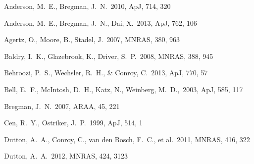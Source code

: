 \documentclass[useAMS,usenatbib]{mn2e}
\def \apj {ApJ}
\def \mnras {MNRAS}
\def \apjs {ApJS}
\begin{document}
\begin{thebibliography}{}


 Anderson, M.~E., Bregman, J.~N.\ 2010, \apj, 714, 320

 Anderson, M.~E., Bregman, J.~N., Dai, X.\ 2013, \apj, 762, 106

 Agertz, O., Moore, B., Stadel, J.\ 2007, \mnras, 380, 963


 Baldry, I.~K., Glazebrook, K., Driver, S.~P.\ 2008, \mnras, 388, 945

 Behroozi, P.~S.,
  Wechsler, R.~H., \& Conroy, C.\ 2013, \apj, 770, 57

 Bell, E.~F., McIntosh, D.~H., Katz, N., Weinberg, M.~D.,\ 2003, \apj, 585, 117


Bregman, J.~N.\ 2007, ARAA, 45, 221


Cen, R.~Y., Ostriker, J.~P.\ 1999, \apj, 514, 1




 Dutton, A.~A., Conroy, 
  C., van den Bosch, F.~C., et al.\ 2011, \mnras, 416, 322
  
 Dutton, A.~A.\ 2012,
  \mnras, 424, 3123
  

\end{thebibliography}
\end{document}
